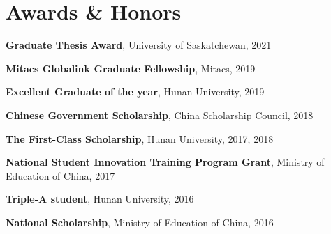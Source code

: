 \documentclass[letterpaper,11pt]{article}
\newcommand{\resumeSubHeadingListStart}{\begin{itemize}[leftmargin=0.15in, label={}]}
\newcommand{\resumeSubHeadingListEnd}{\end{itemize}}
\begin{document}
\section{Awards \& Honors}
  \resumeSubHeadingListStart
    \small{\item{
        \textbf{Graduate Thesis Award}{, University of Saskatchewan, 2021} \\ \vspace{3pt}
        
        \textbf{Mitacs Globalink Graduate Fellowship}{, Mitacs, 2019} \\ \vspace{3pt}
        
        \textbf{Excellent Graduate of the year}{, Hunan University, 2019} \\ \vspace{3pt}
        
        \textbf{Chinese Government Scholarship}{, China Scholarship Council, 2018} \\ \vspace{3pt}
        
        \textbf{The First-Class Scholarship}{, Hunan University, 2017, 2018} \\ \vspace{3pt}
        
        \textbf{National Student Innovation Training Program Grant}{, Ministry of Education of China, 2017} \\ \vspace{3pt}
        
        \textbf{Triple-A student}{, Hunan University, 2016} \\ \vspace{3pt}
        
        \textbf{National Scholarship}{, Ministry of Education of China, 2016}
    }}
  \resumeSubHeadingListEnd


\end{document}
